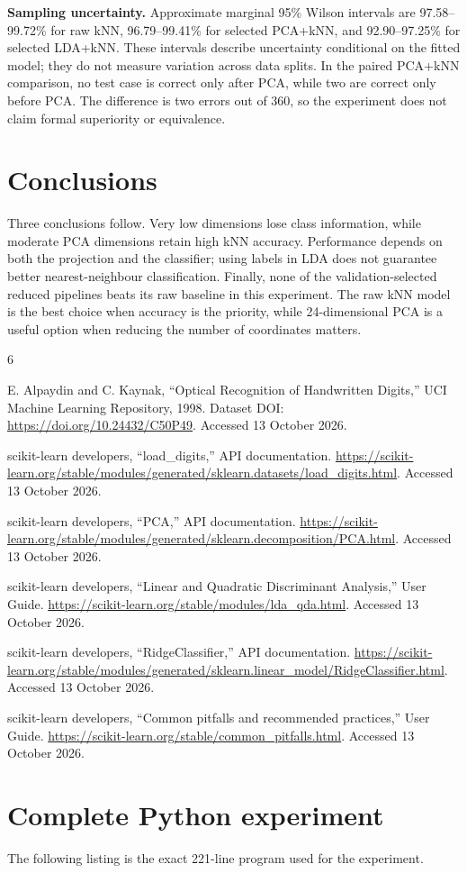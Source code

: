 \documentclass[11pt,a4paper]{article}
\newcommand{\method}[1]{\textbf{#1}}
\begin{document}
\method{Sampling uncertainty.} Approximate marginal 95\% Wilson intervals are 97.58--99.72\% for raw kNN, 96.79--99.41\% for selected PCA+kNN, and 92.90--97.25\% for selected LDA+kNN. These intervals describe uncertainty conditional on the fitted model; they do not measure variation across data splits. In the paired PCA+kNN comparison, no test case is correct only after PCA, while two are correct only before PCA. The difference is two errors out of 360, so the experiment does not claim formal superiority or equivalence.

\section{Conclusions}

Three conclusions follow. Very low dimensions lose class information, while moderate PCA dimensions retain high kNN accuracy. Performance depends on both the projection and the classifier; using labels in LDA does not guarantee better nearest-neighbour classification. Finally, none of the validation-selected reduced pipelines beats its raw baseline in this experiment. The raw kNN model is the best choice when accuracy is the priority, while 24-dimensional PCA is a useful option when reducing the number of coordinates matters.

\clearpage
\sloppy
\begin{thebibliography}{6}

E. Alpaydin and C. Kaynak, \textquotedblleft Optical Recognition of Handwritten Digits,\textquotedblright{} UCI Machine Learning Repository, 1998. Dataset DOI: \url{https://doi.org/10.24432/C50P49}. Accessed 13 October 2026.

scikit-learn developers, \textquotedblleft load\_digits,\textquotedblright{} API documentation. \url{https://scikit-learn.org/stable/modules/generated/sklearn.datasets/load\_digits.html}. Accessed 13 October 2026.

scikit-learn developers, \textquotedblleft PCA,\textquotedblright{} API documentation. \url{https://scikit-learn.org/stable/modules/generated/sklearn.decomposition/PCA.html}. Accessed 13 October 2026.

scikit-learn developers, \textquotedblleft Linear and Quadratic Discriminant Analysis,\textquotedblright{} User Guide. \url{https://scikit-learn.org/stable/modules/lda\_qda.html}. Accessed 13 October 2026.

scikit-learn developers, \textquotedblleft RidgeClassifier,\textquotedblright{} API documentation. \url{https://scikit-learn.org/stable/modules/generated/sklearn.linear\_model/RidgeClassifier.html}. Accessed 13 October 2026.

scikit-learn developers, \textquotedblleft Common pitfalls and recommended practices,\textquotedblright{} User Guide. \url{https://scikit-learn.org/stable/common\_pitfalls.html}. Accessed 13 October 2026.

\end{thebibliography}

\clearpage
\appendix
\section{Complete Python experiment}
The following listing is the exact 221-line program used for the experiment.


\end{document}
